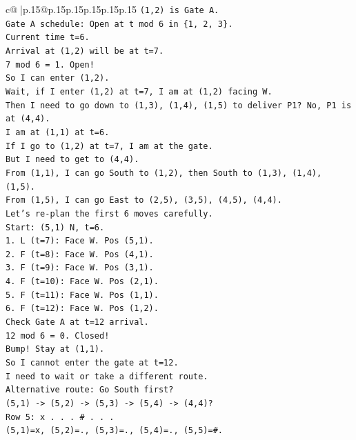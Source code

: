 \documentclass{article}
\begin{document}
{\begin{supertabular}{c@{$\;$}|p{.15\linewidth}@{}p{.15\linewidth}p{.15\linewidth}p{.15\linewidth}p{.15\linewidth}p{.15\linewidth}}
{{{\texttt{(1,2) is Gate A.} \\
\texttt{Gate A schedule: Open at t mod 6 in \{1, 2, 3\}.} \\
\texttt{Current time t=6.} \\
\texttt{Arrival at (1,2) will be at t=7.} \\
\texttt{7 mod 6 = 1. Open!} \\
\texttt{So I can enter (1,2).} \\
\texttt{Wait, if I enter (1,2) at t=7, I am at (1,2) facing W.} \\
\texttt{Then I need to go down to (1,3), (1,4), (1,5) to deliver P1? No, P1 is at (4,4).} \\
\texttt{I am at (1,1) at t=6.} \\
\texttt{If I go to (1,2) at t=7, I am at the gate.} \\
\texttt{But I need to get to (4,4).} \\
\texttt{From (1,1), I can go South to (1,2), then South to (1,3), (1,4), (1,5).} \\
\texttt{From (1,5), I can go East to (2,5), (3,5), (4,5), (4,4).} \\
\texttt{Let's re{-}plan the first 6 moves carefully.} \\
\texttt{Start: (5,1) N, t=6.} \\
\texttt{1. L (t=7): Face W. Pos (5,1).} \\
\texttt{2. F (t=8): Face W. Pos (4,1).} \\
\texttt{3. F (t=9): Face W. Pos (3,1).} \\
\texttt{4. F (t=10): Face W. Pos (2,1).} \\
\texttt{5. F (t=11): Face W. Pos (1,1).} \\
\texttt{6. F (t=12): Face W. Pos (1,2).} \\
\texttt{Check Gate A at t=12 arrival.} \\
\texttt{12 mod 6 = 0. Closed!} \\
\texttt{Bump! Stay at (1,1).} \\
\texttt{So I cannot enter the gate at t=12.} \\
\texttt{I need to wait or take a different route.} \\
\texttt{Alternative route: Go South first?} \\
\texttt{(5,1) {-}> (5,2) {-}> (5,3) {-}> (5,4) {-}> (4,4)?} \\
\texttt{Row 5: x . . . \# . . .} \\
\texttt{(5,1)=x, (5,2)=., (5,3)=., (5,4)=., (5,5)=\#.} \\
}}}
\end{supertabular}}
\end{document}

